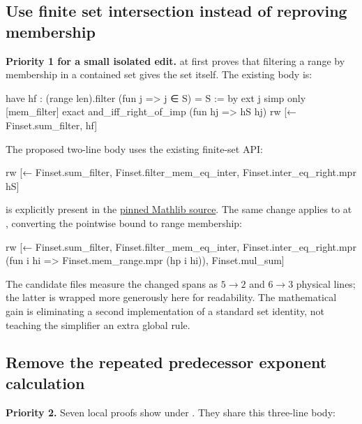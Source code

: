 \subsection{Use finite set intersection instead of reproving membership}

\textbf{Priority 1 for a small isolated edit.}
 at
 first proves that filtering a range by
membership in a contained set gives the set itself. The existing body is:

\begin{Lean}
  have hf : (range len).filter (fun j => j ∈ S) = S := by
    ext j
    simp only [mem_filter]
    exact and_iff_right_of_imp (fun hj => hS hj)
  rw [← Finset.sum_filter, hf]
\end{Lean}

The proposed two-line body uses the existing finite-set API:

\begin{Lean}
  rw [← Finset.sum_filter, Finset.filter_mem_eq_inter,
    Finset.inter_eq_right.mpr hS]
\end{Lean}

 is explicitly present in the
\href{https://github.com/leanprover-community/mathlib4/blob/81a5d257c8e410db227a6665ed08f64fea08e997/Mathlib/Data/Finset/Basic.lean\#L357-L358}{pinned Mathlib source}.
The same change applies to  at
, converting the pointwise bound
 to range membership:

\begin{Lean}
  rw [← Finset.sum_filter, Finset.filter_mem_eq_inter,
    Finset.inter_eq_right.mpr
      (fun i hi => Finset.mem_range.mpr (hp i hi)),
    Finset.mul_sum]
\end{Lean}

The candidate files measure the changed spans as $5\to2$ and $6\to3$
physical lines; the latter is wrapped more generously here for readability.
The mathematical gain is eliminating a second implementation of a standard
set identity, not teaching the simplifier an extra global rule.

\subsection{Remove the repeated predecessor exponent calculation}

\textbf{Priority 2.} Seven local  proofs show
 under . They share this
three-line body:

